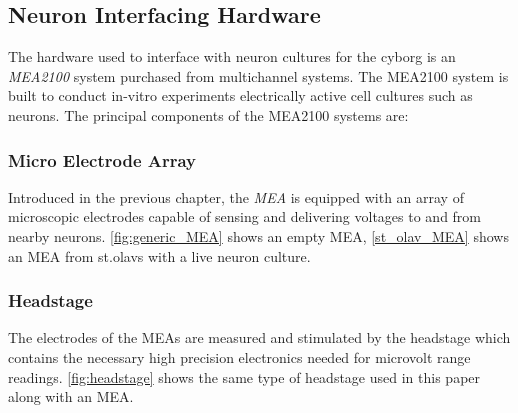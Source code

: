 \subsection{Neuron Interfacing Hardware}
The hardware used to interface with neuron cultures for the cyborg is an
\textit{MEA2100} system purchased from multichannel systems. 
The MEA2100 system is built to conduct in-vitro experiments electrically active
cell cultures such as neurons.
The principal components of the MEA2100 systems are:
\subsubsection{Micro Electrode Array}
Introduced in the previous chapter, the \textit{MEA} is equipped with an array
of microscopic electrodes capable of sensing and delivering voltages to and from
nearby neurons.
\ref{fig:generic_MEA} shows an empty MEA,
\ref{st_olav_MEA} shows an MEA from st.olavs with a live neuron culture.
\subsubsection{Headstage}
The electrodes of the MEAs are measured and stimulated by the headstage which
contains the necessary high precision electronics needed for microvolt range readings.
\ref{fig:headstage} shows the same type of headstage used in this paper along
with an MEA.
